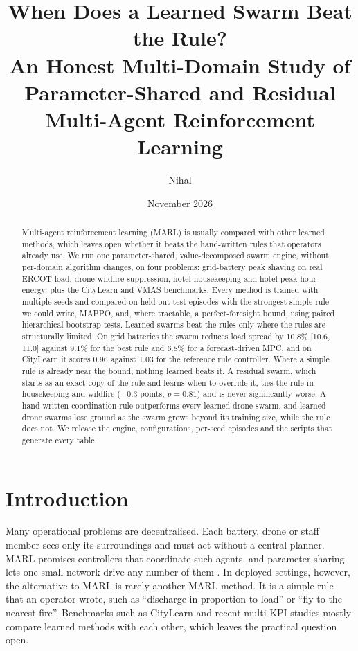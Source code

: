 \documentclass[11pt]{article}
\title{When Does a Learned Swarm Beat the Rule?\\
\large An Honest Multi-Domain Study of Parameter-Shared and Residual Multi-Agent Reinforcement Learning}
\author{Nihal}
\date{November 2026}
\begin{document}
\maketitle

\begin{abstract}
Multi-agent reinforcement learning (MARL) is usually compared with other learned methods, which leaves open whether it beats the hand-written rules that operators already use. We run one parameter-shared, value-decomposed swarm engine, without per-domain algorithm changes, on four problems: grid-battery peak shaving on real ERCOT load, drone wildfire suppression, hotel housekeeping and hotel peak-hour energy, plus the CityLearn and VMAS benchmarks. Every method is trained with multiple seeds and compared on held-out test episodes with the strongest simple rule we could write, MAPPO, and, where tractable, a perfect-foresight bound, using paired hierarchical-bootstrap tests. Learned swarms beat the rules only where the rules are structurally limited. On grid batteries the swarm reduces load spread by 10.8\% [10.6, 11.0] against 9.1\% for the best rule and 6.8\% for a forecast-driven MPC, and on CityLearn it scores 0.96 against 1.03 for the reference rule controller. Where a simple rule is already near the bound, nothing learned beats it. A residual swarm, which starts as an exact copy of the rule and learns when to override it, ties the rule in housekeeping and wildfire ($-0.3$ points, $p=0.81$) and is never significantly worse. A hand-written coordination rule outperforms every learned drone swarm, and learned drone swarms lose ground as the swarm grows beyond its training size, while the rule does not. We release the engine, configurations, per-seed episodes and the scripts that generate every table.
\end{abstract}

\section{Introduction}

Many operational problems are decentralised. Each battery, drone or staff member sees only its surroundings and must act without a central planner. MARL promises controllers that coordinate such agents, and parameter sharing lets one small network drive any number of them \citep{christianos2021selective}. In deployed settings, however, the alternative to MARL is rarely another MARL method. It is a simple rule that an operator wrote, such as ``discharge in proportion to load'' or ``fly to the nearest fire''. Benchmarks such as CityLearn \citep{vazquez2020citylearn} and recent multi-KPI studies \citep{khouja2026citylearnmarl} mostly compare learned methods with each other, which leaves the practical question open.
\end{document}
